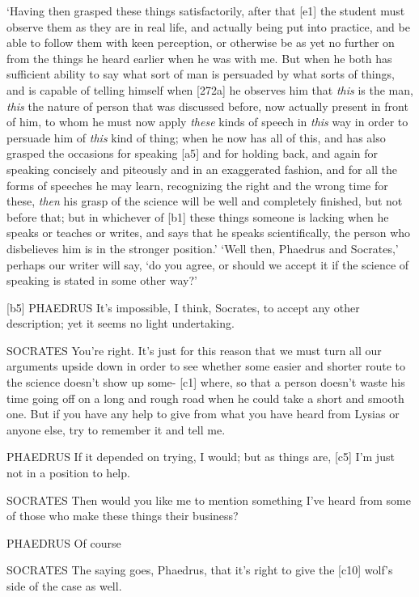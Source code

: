 ‘Having then grasped these things satisfactorily, after that {[}e1{]}
the student must observe them as they are in real life, and actually
being put into practice, and be able to follow them with keen
perception, or otherwise be as yet no further on from the things he
heard earlier when he was with me. But when he both has sufficient
ability to say what sort of man is persuaded by what sorts of things,
and is capable of telling himself when {[}272a{]} he observes him that
{\em this} is the man, {\em this} the nature of person that was
discussed before, now actually present in front of him, to whom he must
now apply {\em these} kinds of speech in {\em this} way in order to
persuade him of {\em this} kind of thing; when he now has all of this,
and has also grasped the occasions for speaking {[}a5{]} and for holding
back, and again for speaking concisely and piteously and in an
exaggerated fashion, and for all the forms of speeches he may learn,
recognizing the right and the wrong time for these, {\em then} his grasp
of the science will be well and completely finished, but not before
that; but in whichever of {[}b1{]} these things someone is lacking when
he speaks or teaches or writes, and says that he speaks scientifically,
the person who disbelieves him is in the stronger position.' ‘Well then,
Phaedrus and Socrates,' perhaps our writer will say, ‘do you agree, or
should we accept it if the science of speaking is stated in some other
way?'

{[}b5{]} PHAEDRUS It's impossible, I think, Socrates, to accept any
other description; yet it seems no light undertaking.

SOCRATES You're right. It's just for this reason that we must turn all
our arguments upside down in order to see whether some easier and
shorter route to the science doesn't show up some- {[}c1{]} where, so
that a person doesn't waste his time going off on a long and rough road
when he could take a short and smooth one. But if you have any help to
give from what you have heard from Lysias or anyone else, try to
remember it and tell me.

PHAEDRUS If it depended on trying, I would; but as things are, {[}c5{]}
I'm just not in a position to help.

SOCRATES Then would you like me to mention something I've heard from
some of those who make these things their business?

PHAEDRUS Of course

SOCRATES The saying goes, Phaedrus, that it's right to give the
{[}c10{]} wolf's side of the case as well.

